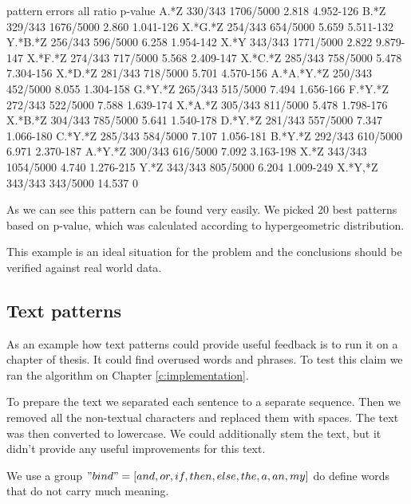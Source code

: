 \begin{file}
pattern      errors      all            ratio      p-value
A.*Z         330/343     1706/5000      2.818      4.952-126
B.*Z         329/343     1676/5000      2.860      1.041-126
X.*G.*Z      254/343     654/5000       5.659      5.511-132
Y.*B.*Z      256/343     596/5000       6.258      1.954-142
X.*Y         343/343     1771/5000      2.822      9.879-147
X.*F.*Z      274/343     717/5000       5.568      2.409-147
X.*C.*Z      285/343     758/5000       5.478      7.304-156
X.*D.*Z      281/343     718/5000       5.701      4.570-156
A.*A.*Y.*Z   250/343     452/5000       8.055      1.304-158
G.*Y.*Z      265/343     515/5000       7.494      1.656-166
F.*Y.*Z      272/343     522/5000       7.588      1.639-174
X.*A.*Z      305/343     811/5000       5.478      1.798-176
X.*B.*Z      304/343     785/5000       5.641      1.540-178
D.*Y.*Z      281/343     557/5000       7.347      1.066-180
C.*Y.*Z      285/343     584/5000       7.107      1.056-181
B.*Y.*Z      292/343     610/5000       6.971      2.370-187
A.*Y.*Z      300/343     616/5000       7.092      3.163-198
X.*Z         343/343     1054/5000      4.740      1.276-215
Y.*Z         343/343     805/5000       6.204      1.009-249
X.*Y,*Z      343/343     343/5000       14.537     0
\end{file}

As we can see this  pattern can be found very easily. We picked 20 best patterns based on p-value, which was calculated according to hypergeometric distribution.

This example is an ideal situation for the problem and the conclusions should be verified against real world data.

\subsection{Text patterns}

As an example how text patterns could provide useful feedback is to run it on a chapter of thesis. It could find overused words and phrases. To test this claim we ran the algorithm on Chapter \ref{c:implementation}.

To prepare the text we separated each sentence to a separate sequence. Then we removed all the non-textual characters and replaced them with spaces. The text was then converted to lowercase. We could additionally stem the text, but it didn't provide any useful improvements for this text.

We use a group $"bind" = [and, or, if, then, else, the, a, an, my]$ do define words that do not carry much meaning.

